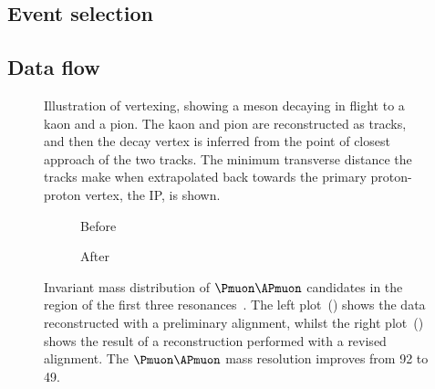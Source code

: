 \subsection{Event selection}
\label{chap:intro:lhcb:detector:trigger}

\subsection{Data flow}
\label{chap:intro:lhcb:detector:dataflow}


\begin{figure}
  \centering
  
  \caption{%
    Illustration of vertexing, showing a \PDz meson decaying in flight to a 
    kaon and a pion.
    The kaon and pion are reconstructed as tracks, and then the \PDzero decay 
    vertex is inferred from the point of closest approach of the two tracks.
    The minimum transverse distance the tracks make when extrapolated back 
    towards the primary proton-proton vertex, the \acf{IP}, is shown.
  }
  \label{fig:intro:lhcb:vertexing}
\end{figure}

\begin{figure}
  \begin{subfigure}{0.5\textwidth}
    \centering
    
    \caption{Before}
    \label{fig:intro:lhcb:alignment:pre}
  \end{subfigure}
  \begin{subfigure}{0.5\textwidth}
    \centering
    
    \caption{After}
    \label{fig:intro:lhcb:alignment:post}
  \end{subfigure}
  \caption{%
    Invariant mass distribution of $\Pmuon\APmuon$ candidates in the region of 
    the first three \PUpsilon resonances~\cite{Dujany:082010}.
    The left plot~() shows the data 
    reconstructed with a preliminary alignment, whilst the right 
    plot~() shows the result of a 
    reconstruction performed with a revised alignment.
    The $\Pmuon\APmuon$ mass resolution improves from \SI{92}{\MeVcc} to 
    \SI{49}{\MeVcc}.
  }
  \label{fig:intro:lhcb:alignment}
\end{figure}
